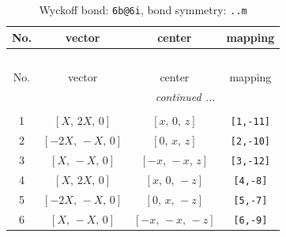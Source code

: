 \documentclass[fleqn,8pt]{jsarticle}
\begin{document}
\begin{longtable}{cccc}
\caption{Wyckoff bond: {\tt 6b@6i}, bond symmetry: {\tt ..m}}
 \\
 \hline \hline
No. & vector & center & mapping \\ \hline \endfirsthead

\multicolumn{3}{l}{\tablename\ \thetable{}} \\
 \hline \hline
No. & vector & center & mapping \\ \hline \endhead

 \hline \hline
\multicolumn{3}{r}{\footnotesize\it continued ...} \\ \endfoot

 \hline \hline
\multicolumn{3}{r}{} \\ \endlastfoot

1 & $\left[ X,\, 2 X,\, 0 \right]$ & $\left[ x,\, 0,\, z \right]$ & {\tt [1,-11]} \\ \hline
2 & $\left[ - 2 X,\, - X,\, 0 \right]$ & $\left[ 0,\, x,\, z \right]$ & {\tt [2,-10]} \\ \hline
3 & $\left[ X,\, - X,\, 0 \right]$ & $\left[ - x,\, - x,\, z \right]$ & {\tt [3,-12]} \\ \hline
4 & $\left[ X,\, 2 X,\, 0 \right]$ & $\left[ x,\, 0,\, - z \right]$ & {\tt [4,-8]} \\ \hline
5 & $\left[ - 2 X,\, - X,\, 0 \right]$ & $\left[ 0,\, x,\, - z \right]$ & {\tt [5,-7]} \\ \hline
6 & $\left[ X,\, - X,\, 0 \right]$ & $\left[ - x,\, - x,\, - z \right]$ & {\tt [6,-9]} \\
\end{longtable}
\renewcommand{\arraystretch}{1.2}
\end{document}
